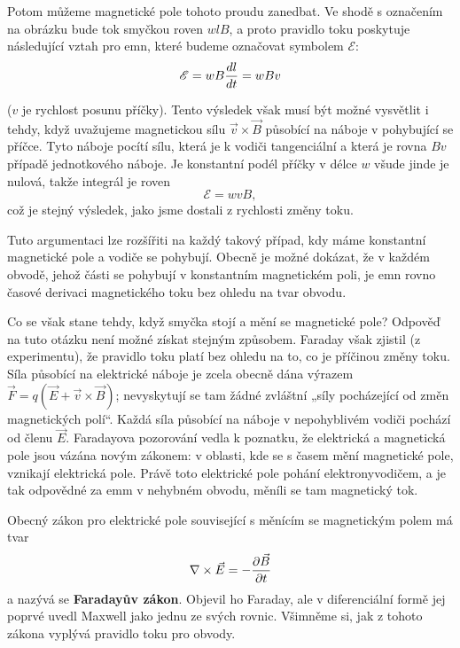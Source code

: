   Potom můžeme magnetické pole tohoto proudu zanedbat. Ve shodě s označením na obrázku bude tok 
  smyčkou roven \(wlB\), a proto pravidlo toku poskytuje následující vztah pro emn, které 
  budeme označovat symbolem \(\mathscr{E}\):  
  \begin{equation}\label{fyz:eq376}
    \mathscr{E} = wB\dfrac{d l}{d t} = wBv
  \end{equation}
  
  (\(v\) je rychlost posunu příčky). Tento výsledek však musí být možné vysvětlit i tehdy, když 
  uvažujeme magnetickou sílu \(\vec{v}\times\vec{B}\) působící na náboje v pohybující se příčce. 
  Tyto náboje pocítí sílu, která je k vodiči tangenciální a která je rovna \(Bv\) případě 
  jednotkového náboje. Je konstantní podél příčky v délce \(w\) všude jinde je nulová, takže 
  integrál je roven
  \begin{equation}\label{fyz:eq377}
    \mathscr{E} = wvB,
  \end{equation}
  což je stejný výsledek, jako jsme dostali z rychlosti změny toku.
  
  Tuto argumentaci lze rozšířiti na každý takový případ, kdy máme konstantní magnetické pole a 
  vodiče se pohybují. Obecně je možné dokázat, že v každém obvodě, jehož části se pohybují v 
  konstantním magnetickém poli, je emn rovno časové derivaci magnetického toku bez ohledu na tvar 
  obvodu.
  
  Co se však stane tehdy, když smyčka stojí a mění se magnetické pole? Odpověď na tuto otázku není 
  možné získat stejným způsobem. Faraday však zjistil (z experimentu), že pravidlo toku platí bez 
  ohledu na to, co je příčinou změny toku. Síla působící na elektrické náboje je zcela obecně dána 
  výrazem \(\vec{F}=q(\vec{E}+ \vec{v}\times\vec{B})\); nevyskytují se tam žádné zvláštní „síly 
  pocházející od změn magnetických polí“. Každá síla působící na náboje v nepohyblivém vodiči 
  pochází od členu \(\vec{E}\). Faradayova pozorování vedla k poznatku, že elektrická a magnetická 
  pole jsou vázána novým zákonem: v oblasti, kde se s časem mění magnetické pole, vznikají 
  elektrická pole. Právě toto elektrické pole pohání elektronyvodičem, a je tak odpovědné za emm v 
  nehybném obvodu, měníli se tam magnetický tok.
  
  Obecný zákon pro elektrické pole související s měnícím se magnetickým polem má tvar
  \begin{equation}\label{fyz:eq378}
    \nabla\times\vec{E} = -\dfrac{\partial \vec{B}}{\partial t}
  \end{equation}
  a nazývá se \textbf{Faradayův zákon}. Objevil ho Faraday, ale v diferenciální formě jej poprvé 
  uvedl Maxwell jako jednu ze svých rovnic. Všimněme si, jak z tohoto zákona vyplývá pravidlo toku 
  pro obvody. 
  
